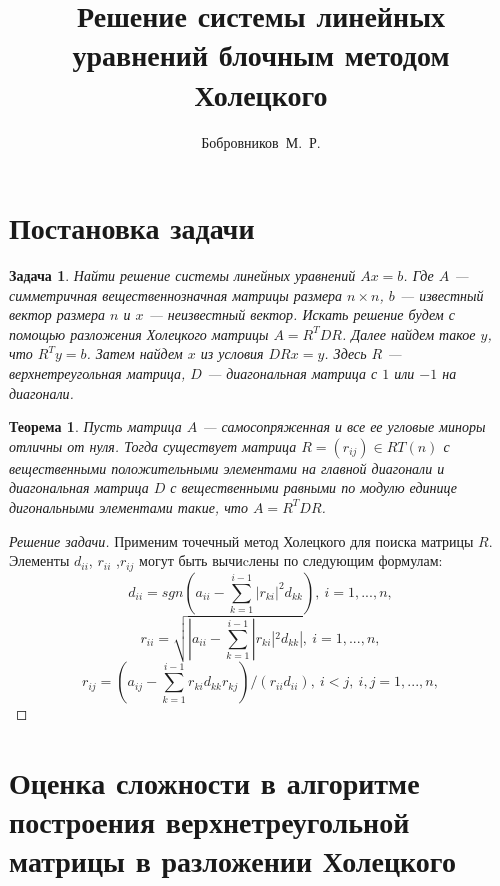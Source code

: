 \documentclass[a4paper, 12pt]{article}
\newtheorem*{theorem*}{Теорема}
\newtheorem*{task*}{Задача}
\begin{document}
\title{Решение системы линейных уравнений блочным 
методом Холецкого}
\author{Бобровников~М.~Р.}
\date{}
\maketitle
\section{Постановка задачи}

\begin{task*}
    Найти решение системы линейных уравнений $A x=b$. Где $A $ --- симметричная 
    вещественнозначная матрицы размера $n \times n$, $b$ --- известный вектор размера
    $n$ и $x$ --- неизвестный вектор.
    Искать решение будем с помощью разложения Холецкого матрицы $A=R^T DR$.
    Далее найдем такое $y$, что $R^T y=b$. Затем найдем $x$ из условия $DR x=y$.
    Здесь $R$ --- верхнетреугольная матрица, $D$ --- диагональная матрица с $1$ или $-1$
    на диагонали.
\end{task*}

\begin{theorem*}
    Пусть матрица $A$ --- самосопряженная и все ее угловые миноры отличны
    от нуля. Тогда существует матрица $R=(r_{ij}) \in RT(n)$  с вещественными 
    положительными элементами на главной диагонали и диагональная матрица
    $D$ с вещественными равными по модулю единице дигональными элементами
    такие, что $A=R^T DR$.
\end{theorem*}

\begin{proof} [Решение задачи]
    
Применим точечный метод Холецкого для поиска матрицы $R$.
Элементы $d_{ii}$, $r_{ii}$ ,$r_{ij}$ могут быть вычиcлены по 
следующим формулам:
\begin{equation} \label{dot}
 d_{ii} = sgn(a_{ii}-\sum_{k=1}^{i-1}|r_{ki}|^2d_{kk}),\  i=1,...,n,
\end{equation}
$$
r_{ii} = \sqrt{|a_{ii}-\sum_{k=1}^{i-1}|r_{ki}|^2d_{kk}|},\  i=1,...,n,
$$
$$
r_{ij} = (a_{ij}-\sum_{k=1}^{i-1}r_{ki}d_{kk}r_{kj})/(r_{ii}d_{ii}),\  
i<j, \ i,j=1,...,n,
$$
\end{proof}

\section{Оценка сложности в алгоритме построения верхнетреугольной матрицы
в разложении Холецкого}
\end{document}
